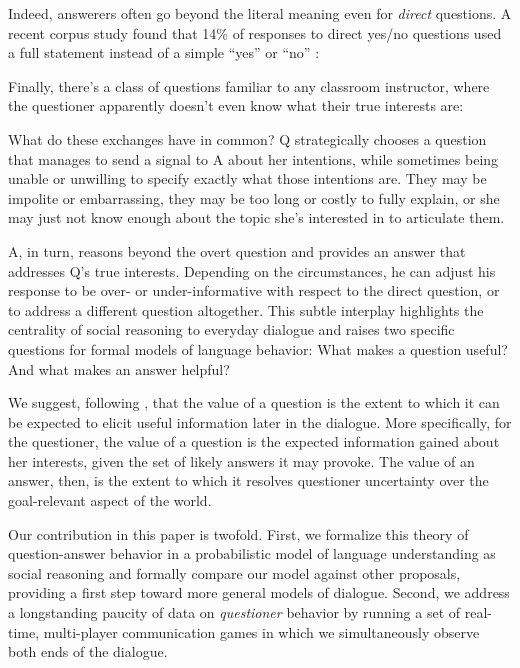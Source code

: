 \documentclass[12pt, floatsintext, jou]{apa6}
\begin{document}
Indeed, answerers often go beyond the literal meaning even for \emph{direct} questions. A recent corpus study found that 14\% of responses to direct yes/no questions used a full statement instead of a simple ``yes'' or ``no'' \cite{DeMarneffeGrimmPotts09_IndirectAnswersCorpus}:


Finally, there's a class of questions familiar to any classroom instructor, where the questioner apparently doesn't even know what their true interests are:


What do these exchanges have in common? Q strategically chooses a question that manages to send a signal to A about her intentions, while sometimes being unable or unwilling to specify exactly what those intentions are. They may be impolite or embarrassing, they may be too long or costly to fully explain, or she may just not know enough about the topic she's interested in to articulate them.

A, in turn, reasons beyond the overt question and provides an answer that addresses Q's true interests. Depending on the circumstances, he can adjust his response to be over- or under-informative with respect to the direct question, or to address a different question altogether.  This subtle interplay highlights the centrality of social reasoning to everyday dialogue and raises two specific questions for formal models of language behavior: What makes a question useful? And what makes an answer helpful? 

We suggest, following , that the value of a question is the extent to which it can be expected to elicit useful information later in the dialogue. 
More specifically, for the questioner, the value of a question is the expected information gained about her interests, given the set of likely answers it may provoke. The value of an answer, then, is the extent to which it resolves questioner uncertainty over the goal-relevant aspect of the world. 

Our contribution in this paper is twofold. First, we formalize this theory of question-answer behavior in a probabilistic model of language understanding as social reasoning and formally compare our model against other proposals, providing a first step toward more general models of dialogue. Second, we address a longstanding paucity of data on \emph{questioner} behavior by running a set of real-time, multi-player communication games in which we simultaneously observe both ends of the dialogue. %
\end{document}
